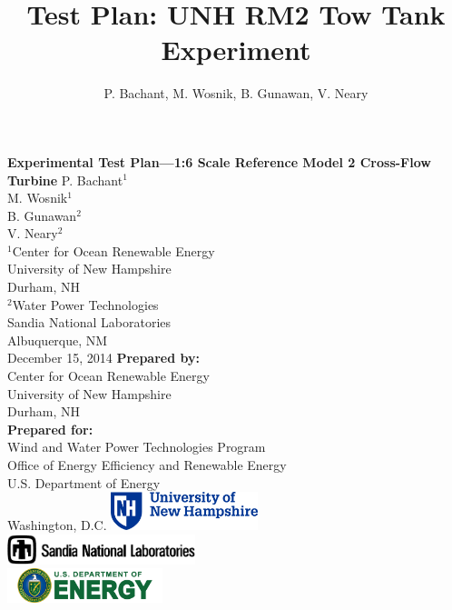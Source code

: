 \documentclass[12pt,letterpaper]{scrreprt}
\author{P. Bachant, M. Wosnik, B. Gunawan, V. Neary}
\title{Test Plan: UNH RM2 Tow Tank Experiment}
\begin{document}
\begin{titlepage}
    \centering
    \addtolength{\topmargin}{.5in}
    {\bfseries \huge
        Experimental Test Plan---1:6 Scale Reference Model 2 Cross-Flow Turbine
    }  
    \vskip1cm
    P. Bachant$^1$\\
    M. Wosnik$^1$\\
    B. Gunawan$^2$\\
    V. Neary$^2$\\  
    \vfill
    $^1$Center for Ocean Renewable Energy \\
    University of New Hampshire \\
    Durham, NH \\
    \vspace{0.1in}
    $^2$Water Power Technologies \\
    Sandia National Laboratories \\
    Albuquerque, NM \\
    \vfill
    December 15, 2014
    \vfill
    \textbf{Prepared by:}\\
    Center for Ocean Renewable Energy\\
    University of New Hampshire\\
    Durham, NH\\
    \vspace{0.1in}
    \textbf{Prepared for:} \\
    Wind and Water Power Technologies Program \\
    Office of Energy Efficiency and Renewable Energy \\
    U.S. Department of Energy \\
    Washington, D.C.
    \vfill
    \includegraphics[width=0.32\textwidth]{Figures/unhlogo} \\
    \vspace{0.1in}
    \includegraphics[width=0.41\textwidth]{Figures/snllogo} \\
    \vspace{0.1in}
    \includegraphics[width=0.34\textwidth]{Figures/doelogo}
    \vfill
\end{titlepage}
\end{document}
